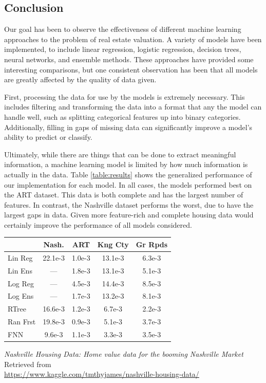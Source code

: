 \documentclass[10pt]{article}
\begin{document}
\begin{multicols}{2}
 		\section{Conclusion}
 		Our goal has been to observe the effectiveness of different machine learning approaches to the problem of real estate valuation. A variety of models have been implemented, to include linear regression, logistic regression, decision trees, neural networks, and ensemble methods. These approaches have provided some interesting comparisons, but one consistent observation has been that all models are greatly affected by the quality of data given.

		First, processing the data for use by the models is extremely necessary. This includes filtering and transforming the data into a format that any the model can handle well, such as splitting categorical features up into binary categories. Additionally, filling in gaps of missing data can significantly improve a model's ability to predict or classify.

		Ultimately, while there are things that can be done to extract meaningful information, a machine learning model is limited by how much information is actually in the data.  Table \ref{table:results} shows the generalized performance of our implementation for each model.  In all cases, the models performed best on the ART dataset.  This data is both complete and has the largest number of features.  In contrast, the Nashville dataset performs the worst, due to have the largest gaps in data. Given more feature-rich and complete housing data would certainly improve the performance of all models considered.
		
		\begin{center}
	        \captionsetup{type=table}
	        \begin{tabular}{l|c|c|c|c}
	        	         & Nash.   & ART     & Kng Cty & Gr Rpds \\
	        	\hline
	        	Lin Reg  & 22.1e-3 & 1.0e-3  & 13.1e-3  & 6.3e-3 \\
	        	Lin Ens  & ---     & 1.8e-3  & 13.1e-3  & 5.1e-3 \\
	        	Log Reg  & ---     & 4.5e-3  & 14.4e-3  & 8.5e-3 \\
	        	Log Ens  & ---     & 1.7e-3 & 13.2e-3  & 8.1e-3 \\
	        	RTree  	 & 16.6e-3 & 1.2e-3	 & 6.7e-3  & 2.2e-3  \\
	        	Ran Frst & 19.8e-3 & 0.9e-3  & 5.1e-3  & 3.7e-3  \\
	        	FNN      & 9.6e-3  & 1.1e-3  & 3.3e-3  & 3.5e-3  \\	        	
	        \end{tabular}
			\label{table:results}
		\end{center}
		\begin{thebibliography}{13}
			\textit{Nashville Housing Data: Home value data for the booming Nashville Market}
			Retrieved from \\ \small{\url{https://www.kaggle.com/tmthyjames/nashville-housing-data/}}
			

\end{thebibliography}
\end{multicols}
\end{document}
